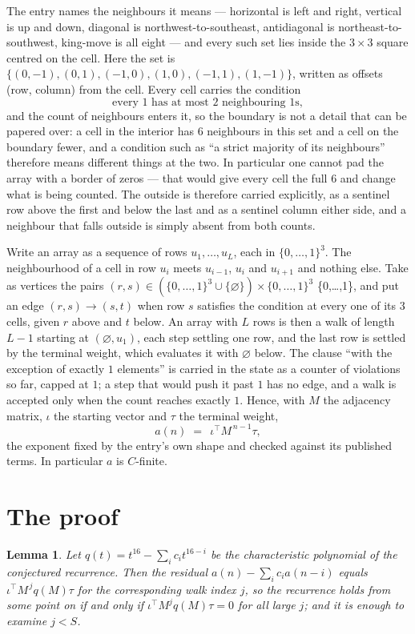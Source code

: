 \documentclass[11pt,a4paper]{article}
\theoremstyle{plain}
\newtheorem{lemma}[theorem]{Lemma}
\theoremstyle{definition}
\begin{document}
The entry names the neighbours it means --- horizontal is left and right, vertical is up and
down, diagonal is northwest-to-southeast, antidiagonal is northeast-to-southwest, king-move is
all eight --- and every such set lies inside the $3\times3$ square centred on the cell. Here
the set is $\{(0,-1), (0,1), (-1,0), (1,0), (-1,1), (1,-1)\}$, written as offsets (row, column) from the cell. Every cell carries
the condition
\[
\text{every 1 has at most 2 neighbouring 1s},
\]
and the count of neighbours enters it, so the boundary is not a detail that can be papered
over: a cell in the interior has $6$ neighbours in this set and a cell on the boundary
fewer, and a condition such as ``a strict majority of its neighbours'' therefore means
different things at the two. In particular one cannot pad the array with a border of zeros ---
that would give every cell the full $6$ and change what is being counted. The outside is
therefore carried
explicitly, as a sentinel row above the first and below the last and as a sentinel column
either side, and a neighbour that falls outside is simply absent from both counts.

Write an array as a sequence of rows $u_1,\dots,u_L$, each in
$\{0,\dots,1\}^{3}$. The neighbourhood of a cell in row $u_i$ meets $u_{i-1}$,
$u_i$ and $u_{i+1}$ and nothing else. Take as vertices the pairs
$(r,s)\in(\{0,\dots,1\}^{3}\cup\{\varnothing\})\times\{0,\dots,1\}^{3}$ \times \{0,\dots,1\},
and put an edge $(r,s)\to(s,t)$ when row $s$ satisfies the condition at every one of its
$3$ cells, given $r$ above and $t$ below. An array with $L$ rows is then a walk of length
$L-1$ starting at $(\varnothing,u_1)$, each step settling one row, and the last row is
settled by the terminal weight, which evaluates it with $\varnothing$ below. The clause ``with the exception of exactly $1$ elements'' is carried in
the state as a counter of violations so far, capped at $1$; a step that would push it past
$1$ has no edge, and a walk is accepted only when the count reaches exactly $1$. Hence,
with $M$ the adjacency matrix, $\iota$ the starting vector and $\tau$ the terminal weight,
\[
a(n)\;=\;\,\iota^{\!\top}M^{\,n-1}\tau ,
\]
the exponent fixed by the entry's own shape and checked against its published terms. In
particular $a$ is $C$-finite.

\section{The proof}

\begin{lemma}\label{lem:crit}
Let $q(t)=t^{16}-\sum_i c_it^{16-i}$ be the characteristic polynomial of the
conjectured recurrence. Then the residual $a(n)-\sum_ic_ia(n-i)$ equals
$\iota^{\!\top}M^{\,j}q(M)\tau$ for the corresponding walk index $j$, so the
recurrence holds from some point on if and only if $\iota^{\!\top}M^{j}q(M)\tau=0$ for all
large $j$; and it is enough to examine $j<S$.
\end{lemma}
\end{document}

